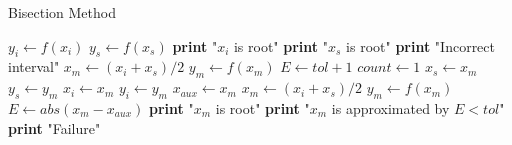\documentclass{article}
\begin{document}
  \begin{algorithm}
    \caption{Bisection Method}
    \begin{algorithmic}[1]
        \State $y_{i} \gets f(x_{i})$
        \State $y_{s} \gets f(x_{s})$
          \State \textbf{print} "$x_{i}$ is root"
          \State \textbf{print} "$x_{s}$ is root"
          \State \textbf{print} "Incorrect interval"
        \Else
          \State $x_{m} \gets (x_{i} + x_{s}) / 2$
          \State $y_{m} \gets f(x_{m})$
          \State $E \gets tol + 1$
          \State $count \gets 1$
              \State $x_{s} \gets x_{m}$
              \State $y_{s} \gets y_{m}$
            \Else
              \State $x_{i} \gets x_{m}$
              \State $y_{i} \gets y_{m}$
            \EndIf
            \State $x_{aux} \gets x_{m}$
            \State $x_{m} \gets (x_{i} + x_{s}) / 2$
            \State $y_{m} \gets f(x_{m})$
            \State $E \gets abs(x_{m} - x_{aux})$
          \EndWhile
            \State \textbf{print} "$x_{m}$ is root"
            \State \textbf{print} "$x_{m}$ is approximated by $E < tol$"
          \Else
            \State \textbf{print} "Failure"
          \EndIf
        \EndIf
      \EndProcedure
    \end{algorithmic}
  \end{algorithm}
\end{document}
